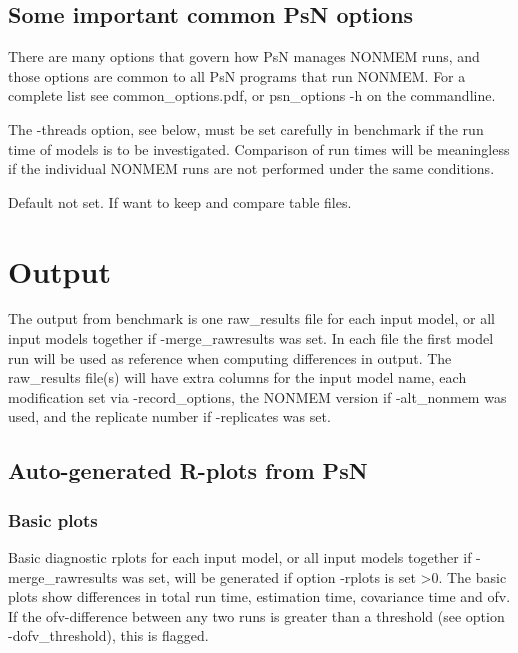 \subsection{Some important common PsN options}
There are many options that govern how PsN manages NONMEM runs, and
those options are common to all PsN programs that run NONMEM.
For a complete list see common\_options.pdf, 
or psn\_options -h on the commandline.

The -threads option, see below, must be set carefully in benchmark if the run time
of models is to be investigated. Comparison of run times will be meaningless
if the individual NONMEM runs are not performed under the same conditions.

\begin{optionlist}
Default not set. If want to keep and compare table files.
\end{optionlist}


\section{Output}
The output from benchmark is
one raw\_results file for each input model, or all input models together if -merge\_rawresults was set.
In each file the first model run will be used as reference when computing differences in output.
The raw\_results file(s) will have extra columns for the input model name, each
modification set via -record\_options, the NONMEM version if -alt\_nonmem was used, and the replicate
number if -replicates was set.




\subsection{Auto-generated R-plots from PsN}
\newcommand{\rplotsconditions}{The default benchmark template 
requires no special R libraries.
If no pdf is generated,
see the .Rout file in the main run directory for error messages.}


\subsubsection*{Basic plots}
Basic diagnostic rplots for each input model, or all input models together if -merge\_rawresults was set, 
will be generated if option -rplots is set >0.
The basic plots show differences in total run time, estimation time, covariance time and ofv.
If the ofv-difference between any two runs is greater than a threshold (see option -dofv\_threshold), this is flagged. 

